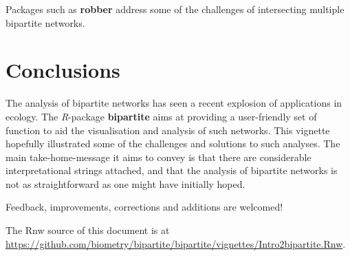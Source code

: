 \documentclass[a4paper, 11pt]{article}\usepackage[]{graphicx}\usepackage[]{color}
\newcommand{\package}[1]{\textbf{#1}}
\newcommand{\proglang}[1]{\textsl{#1}}
\begin{document}
Packages such as \package{robber} address some of the challenges of intersecting multiple bipartite networks.

\section*{Conclusions}%
The analysis of bipartite networks has seen a recent explosion of applications in ecology. The \proglang{R}-package \package{bipartite} aims at providing a user-friendly set of function to aid the visualisation and analysis of such networks. This vignette hopefully illustrated some of the challenges and solutions to such analyses. The main take-home-message it aims to convey is that there are considerable interpretational strings attached, and that the analysis of bipartite networks is not as straightforward as one might have initially hoped.

\medskip
\noindent Feedback, improvements, corrections and additions are welcomed!







\bigskip

The Rnw source of this document is at \url{https://github.com/biometry/bipartite/bipartite/vignettes/Intro2bipartite.Rnw}.

\setlength{\bibsep}{0cm}
\def\bibfont{\small}


\printindex
\end{document}
